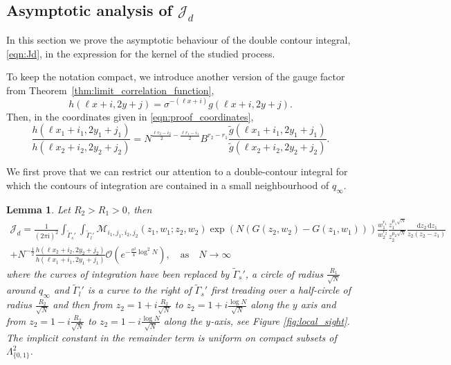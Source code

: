 \documentclass[11pt]{article}
\theoremstyle{plain}
\newtheorem{lemma}[theorem]{Lemma}
\theoremstyle{definition}
\numberwithin{equation}{section}
\renewcommand{\d}{\,\mathrm{d}}
\renewcommand{\i}{\mathrm{i}}
\begin{document}
\subsection{Asymptotic analysis of $\mathcal{J}_d$}\label{sec:Jd}
In this section we prove the asymptotic behaviour of the double contour integral, \eqref{eqn:Jd}, in the expression for the kernel of the studied process. 

To keep the notation compact, we introduce another version of the gauge factor from Theorem~\ref{thm:limit_correlation_function},
\begin{equation}\label{eqn:new_gauge}
h(\ell x+i,2y+j)=\sigma^{-(\ell x+i)}g(\ell x+i,2y+j).
\end{equation} 
Then, in the coordinates given in \eqref{eqn:proof_coordinates},
\begin{equation}\label{eqn:gauge_proof_coordinates}
\frac{h(\ell x_1+i_1,2y_1+j_1)}{h(\ell x_2+i_2,2y_2+j_2)}
=N^{\frac{\ell r_2-i_2}{2}-\frac{\ell r_1-i_1}{2}} 
B^{r_2-r_1}
\frac{\tilde g(\ell x_1+i_1,2y_1+j_1)}{\tilde g(\ell x_2+i_2,2y_2+j_2)}.
\end{equation}

We first prove that we can restrict our attention to a double-contour integral for which the contours of integration are contained in a small neighbourhood of $q_{\infty}$.
\begin{lemma}%
\label{lem:gcan}
Let $R_2>R_1>0$, then
 \begin{multline}\label{eqn:gcan}
\mathcal{J}_d=
\frac{1}{(2\pi\i)^2}\int_{\tilde \Gamma_s'}\int_{\tilde \Gamma_l'}
\boldsymbol{\mathcal{M}}_{i_1,j_1,i_2,j_2}(z_1,w_1;z_2,w_2) 
\exp\left({N(G(z_2,w_2)-G(z_1,w_1))}\right)
\frac{w_1^{r_1}}{w_2^{r_2}}
 \frac{z_1^{\mu_1\sqrt{N}}}{z_2^{\mu_2\sqrt{N}}}
 \frac{\d z_2\d z_1}{z_2(z_2-z_1)}
\\+N^{-\frac{1}{2}}\frac{h(\ell x_2+i_2,2y_2+j_2)}{h(\ell x_1+i_1,2y_1+j_1)}\mathcal{O}\left(e^{-\frac{\sigma^2}{4}\log^2 N}\right),\quad \text{as}\quad N\rightarrow\infty
\end{multline}
where the curves of integration have been replaced by $\widetilde{\Gamma}_s'$, a circle of radius $\frac{R_1}{\sqrt{N}}$ around $q_{\infty}$ and $\widetilde{\Gamma}_l'$ is a curve to the right of $\widetilde{\Gamma}_s'$ first treading over a half-circle of radius  $\frac{R_2}{\sqrt{N}}$ and then from  $z_2=1+i\frac{R_2}{\sqrt{N}}$ to $z_2=1+i\frac{\log N}{\sqrt{N}}$ along the $y$ axis and from $z_2=1-i\frac{R_2}{\sqrt{N}}$ to $z_2=1-i \frac{\log N}{\sqrt{N}}$ along the $y$-axis, see Figure \ref{fig:local_sight}. The implicit constant in the remainder term is uniform on compact subsets of $\Lambda_{\{0,1\}}^2$.
%
\end{lemma}
\end{document}
